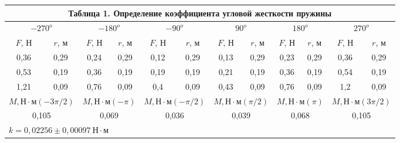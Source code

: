 \documentclass[a4paper,14pt]{article}
\begin{document}
\begin{center}
	\begin{tabular}{|llllllllllll|}
		\multicolumn{12}{c}{Таблица 1. Определение коэффициента угловой жесткости пружины} \bigstrut[b]\\
		\hline
		\multicolumn{2}{|c|}{\(-270^{o}\)} & \multicolumn{2}{c|}{\(-180^{o}\)} & \multicolumn{2}{c|}{\(-90^{o}\)} & \multicolumn{2}{c|}{\(90^{o}\)} & \multicolumn{2}{c|}{\(180^{o}\)} & \multicolumn{2}{c|}{\(270^{o}\)} \bigstrut\\
		\hline
		\multicolumn{1}{|c|}{\(F\), Н} & \multicolumn{1}{c|}{\(r\), м} & \multicolumn{1}{|c|}{\(F\), Н} & \multicolumn{1}{c|}{\(r\), м} & \multicolumn{1}{|c|}{\(F\), Н} & \multicolumn{1}{c|}{\(r\), м} & \multicolumn{1}{|c|}{\(F\), Н} & \multicolumn{1}{c|}{\(r\), м} & \multicolumn{1}{|c|}{\(F\), Н} & \multicolumn{1}{c|}{\(r\), м} & \multicolumn{1}{|c|}{\(F\), Н} & \multicolumn{1}{c|}{\(r\), м} \bigstrut\\
		\hline
		\multicolumn{1}{|c|}{0,36} & \multicolumn{1}{c|}{0,29} & \multicolumn{1}{c|}{0,24} & \multicolumn{1}{c|}{0,29} & \multicolumn{1}{c|}{0,12} & \multicolumn{1}{c|}{0,29} & \multicolumn{1}{c|}{0,13} & \multicolumn{1}{c|}{0,29} & \multicolumn{1}{c|}{0,23} & \multicolumn{1}{c|}{0,29} & \multicolumn{1}{c|}{0,36} & \multicolumn{1}{c|}{0,29} \bigstrut\\
		\hline
		\multicolumn{1}{|c|}{0,53} & \multicolumn{1}{c|}{0,19} & \multicolumn{1}{c|}{0,36} & \multicolumn{1}{c|}{0,19} & \multicolumn{1}{c|}{0,19} & \multicolumn{1}{c|}{0,19} & \multicolumn{1}{c|}{0,21} & \multicolumn{1}{c|}{0,19} & \multicolumn{1}{c|}{0,36} & \multicolumn{1}{c|}{0,19} & \multicolumn{1}{c|}{0,54} & \multicolumn{1}{c|}{0,19} \bigstrut\\
		\hline
		\multicolumn{1}{|c|}{1,21} & \multicolumn{1}{c|}{0,09} & \multicolumn{1}{c|}{0,76} & \multicolumn{1}{c|}{0,09} & \multicolumn{1}{c|}{0,4} & \multicolumn{1}{c|}{0,09} & \multicolumn{1}{c|}{0,43} & \multicolumn{1}{c|}{0,09} & \multicolumn{1}{c|}{0,76} & \multicolumn{1}{c|}{0,09} & \multicolumn{1}{c|}{1,2} & \multicolumn{1}{c|}{0,09} \bigstrut\\
		\hline
		\multicolumn{2}{|c|}{\(M, \text{Н}\cdot\text{м} (-3\pi/2) \)} & \multicolumn{2}{c|}{\(M, \text{Н}\cdot\text{м} (-\pi) \)} & \multicolumn{2}{c|}{\(M, \text{Н}\cdot\text{м} (-\pi/2) \)} & \multicolumn{2}{c|}{\(M, \text{Н}\cdot\text{м} (\pi/2) \)} & \multicolumn{2}{c|}{\(M, \text{Н}\cdot\text{м} (\pi) \)} & \multicolumn{2}{c|}{\(M, \text{Н}\cdot\text{м} (3\pi/2) \)} \bigstrut\\
		\hline
		\multicolumn{2}{|c|}{0,105} & \multicolumn{2}{c|}{0,069} & \multicolumn{2}{c|}{0,036} & \multicolumn{2}{c|}{0,039} & \multicolumn{2}{c|}{0,068} & \multicolumn{2}{c|}{0,105} \bigstrut\\
		\hline
		\multicolumn{12}{|l|}{\(k = 0,02256 \pm 0,00097 \ \text{Н}\cdot\text{м} \)} \bigstrut\\
		\hline
	\end{tabular}%
\end{center}
\end{document}
